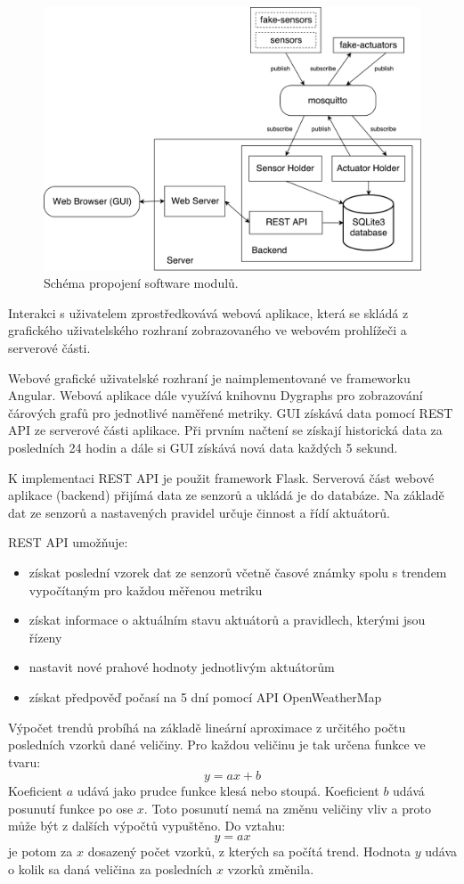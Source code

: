 \documentclass[11pt,a4paper]{article}
\begin{document}
\begin{figure}[htb]
    \centering
    \includegraphics[width=0.75\linewidth]{sw-scheme}
    \caption{Schéma propojení software modulů.}
    \label{fig:sw-scheme}
\end{figure}

Interakci s uživatelem zprostředkovává webová aplikace, která se skládá z grafického uživatelského rozhraní zobrazovaného ve webovém prohlížeči a serverové části.

Webové grafické uživatelské rozhraní je naimplementované ve frameworku Angular. Webová aplikace dále využívá knihovnu Dygraphs pro zobrazování čárových grafů pro jednotlivé naměřené metriky. GUI získává data pomocí REST API ze serverové části aplikace. Při prvním načtení se získají historická data za posledních 24 hodin a dále si GUI získává nová data každých 5 sekund.

K implementaci REST API je použit framework Flask.
Serverová část webové aplikace (backend) přijímá data ze senzorů a ukládá je do databáze.
Na základě dat ze senzorů a nastavených pravidel určuje činnost a řídí aktuátorů.

REST API umožňuje:
\begin{itemize}
    \item získat poslední vzorek dat ze senzorů včetně časové známky spolu s trendem vypočítaným pro každou měřenou metriku
    \item získat informace o aktuálním stavu aktuátorů a pravidlech, kterými jsou řízeny
    \item nastavit nové prahové hodnoty jednotlivým aktuátorům
    \item získat předpověď počasí na 5 dní pomocí API OpenWeatherMap
\end{itemize}

Výpočet trendů probíhá na základě lineární aproximace z určitého počtu posledních vzorků dané veličiny.
Pro každou veličinu je tak určena funkce ve tvaru:
\[
    y = a x + b
\]
Koeficient $a$ udává jako prudce funkce klesá nebo stoupá.
Koeficient $b$ udává posunutí funkce po ose $x$.
Toto posunutí nemá na změnu veličiny vliv a proto může být z dalších výpočtů vypuštěno.
Do vztahu:
\[
    y = a x
\]
je potom za $x$ dosazený počet vzorků, z kterých sa počítá trend.
Hodnota $y$ udáva o kolik sa daná veličina za posledních $x$ vzorků změnila.
\end{document}
